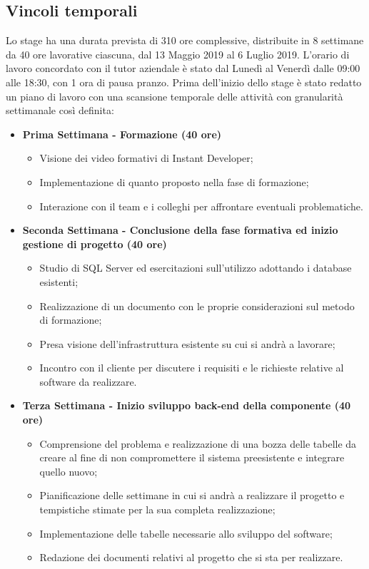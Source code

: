 \subsection{Vincoli temporali}
Lo stage ha una durata prevista di 310 ore complessive, distribuite in 8 settimane da 40 ore lavorative ciascuna, dal 13 Maggio 2019 al 6 Luglio 2019. L'orario di lavoro concordato con il tutor aziendale è stato dal Lunedì al Venerdì dalle 09:00 alle 18:30, con 1 ora di pausa pranzo. Prima dell'inizio dello stage è stato redatto un piano di lavoro con una scansione temporale delle attività con granularità settimanale così definita:
\begin{itemize}
	
	\item \textbf{Prima Settimana - Formazione (40 ore)}
	\begin{itemize}
		\item Visione dei video formativi di Instant Developer;
		\item Implementazione di quanto proposto nella fase di formazione;
		\item Interazione con il team e i colleghi per affrontare eventuali problematiche.
		
	\end{itemize}
	\item \textbf{Seconda Settimana - Conclusione della fase formativa ed inizio gestione di progetto (40 ore)} 
	\begin{itemize}
		\item Studio di SQL Server ed esercitazioni sull'utilizzo adottando i database esistenti;
		\item Realizzazione di un documento con le proprie considerazioni sul metodo di formazione;
		\item Presa visione dell'infrastruttura esistente su cui si andrà a lavorare; 
		\item Incontro con il cliente per discutere i requisiti e le richieste relative al software da realizzare.
	\end{itemize}
	
	\item \textbf{Terza Settimana - Inizio sviluppo back-end della componente (40 ore)} 
	\begin{itemize}
		\item Comprensione del problema e realizzazione di una bozza delle tabelle da creare al fine di non compromettere il sistema preesistente e integrare quello nuovo;
		\item Pianificazione delle settimane in cui si andrà a realizzare il progetto e tempistiche stimate per la sua completa realizzazione;
		\item Implementazione delle tabelle necessarie allo sviluppo del software;
		\item Redazione dei documenti relativi al progetto che si sta per realizzare.
	\end{itemize}
	

\end{itemize}
